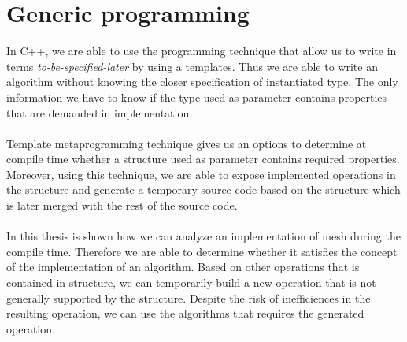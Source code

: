 \section{Generic programming}

In C++, we are able to use the programming technique that allow us to write in terms
\emph{to-be-specified-later} by using a templates. Thus we are able to write an algorithm
without knowing the closer specification of instantiated type. The only information we have
to know if the type used as parameter contains properties that are demanded in implementation.\\
\\
Template metaprogramming technique gives us an options to determine at compile time whether
a structure used as parameter contains required properties. Moreover, using this technique,
we are able to expose implemented operations in the structure and generate a temporary source
code based on the structure which is later merged with the rest of the source code.\\
\\
In this thesis is shown how we can analyze an implementation of mesh during the compile time.
Therefore we are able to determine whether it satisfies the concept of the implementation of
an algorithm. Based on other operations that is contained in structure, we can temporarily build a new
operation that is not generally supported by the structure. Despite the risk of inefficiences in
the resulting operation, we can use the algorithms that requires the generated operation.
